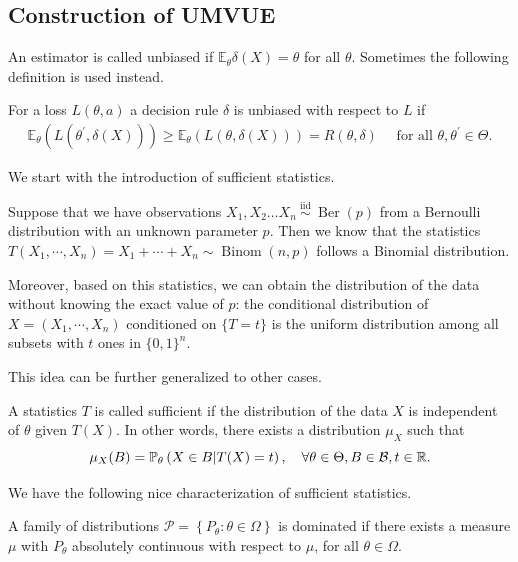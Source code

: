 \subsection{Construction of UMVUE}

An estimator is called unbiased if $\mathbb{E}_\theta \delta(X)=\theta$ for all $\theta$. Sometimes the following definition is used instead.
\begin{de}
    For a loss $L(\theta, a)$ a decision rule $\delta$ is unbiased with respect to $L$ if
\begin{align*}
\mathbb{E}_\theta\left(L\left(\theta^{\prime}, \delta(X)\right)\right) \geq \mathbb{E}_\theta(L(\theta, \delta(X)))=R(\theta, \delta) \quad \text { for all } \theta, \theta^{\prime} \in \Theta .
\end{align*}
\end{de}



We start with the introduction of sufficient statistics.
\begin{eg}
    Suppose that we have observations $X_1, X_2 \ldots X_n \stackrel{\text { iid }}{\sim} \operatorname{Ber}(p)$ from a Bernoulli distribution with an unknown parameter $p$. Then we know that the statistics $T\left(X_1,\cdots,X_n\right)=X_1+\cdots+X_n \sim \operatorname{Binom}(n, p)$ follows a Binomial distribution. 
    
    Moreover, based on this statistics, we can obtain the distribution of the data without knowing the exact value of $p$: the conditional distribution of $X=(X_1,\cdots,X_n)$ conditioned on $\{T=t\}$ is the uniform distribution among all subsets with $t$ ones in $\{0,1\}^n$.
\end{eg}
This idea can be further generalized to other cases.

 \begin{de}
     A statistics $T$ is called sufficient if the distribution of the data $X$ is independent of $\theta$ given $T(X)$. In other words, there exists a distribution $\mu_X$ such that
     \[
     \mu_X(B)=\mathbb{P}_\theta\left(X\in B|T(X)=t\right),\quad \forall\theta\in\Theta, B \in \mathcal{B}, t\in \mathbb{R}.
     \]
 \end{de}

We have the following nice characterization of sufficient statistics.
\begin{de}
    A family of distributions $\mathcal{P}=\left\{P_\theta: \theta \in \Omega\right\}$ is dominated if there exists a measure $\mu$ with $P_\theta$ absolutely continuous with respect to $\mu$, for all $\theta \in \Omega$.
\end{de}

